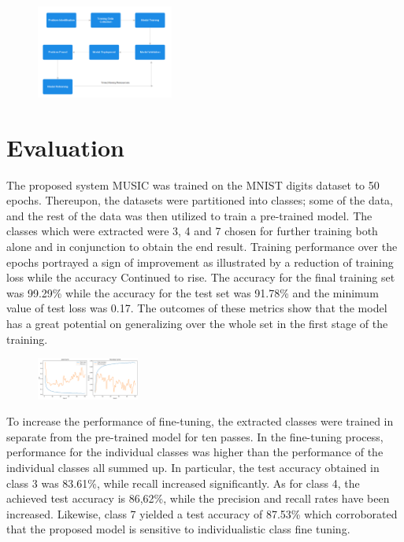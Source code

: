 \documentclass[conference]{IEEEtran}
\begin{document}
\begin{figure}[h]
    \centering
    \includegraphics[width=0.4\textwidth, keepaspectratio]{fig1.png}
    
\end{figure}


\section{Evaluation}
The proposed system MUSIC was trained on the MNIST digits dataset to 50 epochs. Thereupon, the datasets were partitioned into classes; some of the data, and the rest of the data was then utilized to train a pre-trained model. The classes which were extracted were 3, 4 and 7 chosen for further training both alone and in conjunction to obtain the end result. Training performance over the epochs portrayed a sign of improvement as illustrated by a reduction of training loss while the accuracy Continued to rise.  The accuracy for the final training set was 99.29\% while the accuracy for the test set was 91.78\% and the minimum value of test loss was 0.17. The outcomes of these metrics show that the model has a great potential on generalizing over the whole set in the first stage of the training.


\begin{figure}[h]
    \centering
    \includegraphics[width=0.3\textwidth, keepaspectratio]{predefined.png}
    
\end{figure}

To increase the performance of fine-tuning, the extracted classes were trained in separate from the pre-trained model for ten passes. In the fine-tuning process, performance for the individual classes was higher than the performance of the individual classes all summed up. In particular, the test accuracy obtained in class 3 was 83.61\%, while recall increased significantly. As for class 4, the achieved test accuracy is 86,62\%, while the precision and recall rates have been increased. Likewise, class 7 yielded a test accuracy of 87.53\% which corroborated that the proposed model is sensitive to individualistic class fine tuning. 
\end{document}
